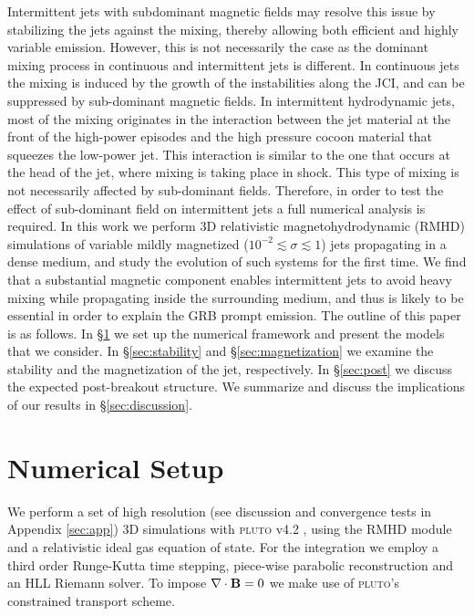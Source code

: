 \documentclass[fleqn,usenatbib]{mnras}
\begin{document}
	Intermittent jets with subdominant magnetic fields may resolve this issue by stabilizing the jets against the mixing, thereby allowing both efficient and highly variable emission.
	However, this is not necessarily the case as the dominant mixing process in continuous and intermittent jets is different. In continuous jets the mixing is induced by the growth of the instabilities along the JCI, and can be suppressed by sub-dominant magnetic fields. In intermittent hydrodynamic jets, most of the mixing originates in the interaction between the jet material at the front of the high-power episodes and the high pressure cocoon material that squeezes the low-power jet. This interaction is similar to the one that occurs at the head of the jet, where mixing is taking place in shock. This type of mixing is not necessarily affected by sub-dominant fields. Therefore, in order to test the effect of sub-dominant field on intermittent jets a full numerical analysis is required.
	In this work we perform 3D relativistic magnetohydrodynamic (RMHD) simulations of variable mildly magnetized ($ 10^{-2} \lesssim \sigma \lesssim 1 $) jets propagating in a dense medium, and study the evolution of such systems for the first time.
	We find that a substantial magnetic component enables intermittent jets to avoid heavy mixing while propagating inside the surrounding medium, and thus is likely to be essential in order to explain the GRB prompt emission.
	The outline of this paper is as follows. In \S\ref{sec:setup} we set up the numerical framework and present the models that we consider. In \S\ref{sec:stability} and \S\ref{sec:magnetization} we examine the stability and the magnetization of the jet, respectively. In \S\ref{sec:post} we discuss the expected post-breakout structure. We summarize and discuss the implications of our results in \S\ref{sec:discussion}.
	
	\section{Numerical Setup}\label{sec:setup}
	
	We perform a set of high resolution (see discussion and convergence tests in Appendix \ref{sec:app}) 3D simulations with \textsc{pluto} v4.2 \citep{Mignone2007}, using the RMHD module and a relativistic ideal gas equation of state.
	For the integration we employ a third order Runge-Kutta time stepping, piece-wise parabolic reconstruction and an HLL Riemann solver. To impose $ \nabla \cdot {\bf B} =0$ we make use of \textsc{pluto}'s constrained transport scheme.
	
\end{document}
